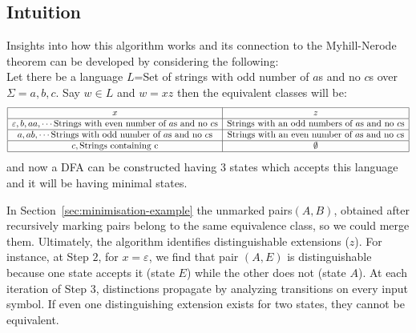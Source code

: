 \documentclass{article}
\begin{document}
\subsection{Intuition}
Insights into how this algorithm works and its connection to the Myhill-Nerode theorem can be developed by considering the following:\\
Let there be a language $L$=Set of strings with odd number of $a$s and no $c$s over $\Sigma={a,b,c}.$
Say $w\in L$ and $w=xz$ then the equivalent classes will be:
$$
\begin{array}{|c|c|}
\hline
x & z \\ \hline
\varepsilon, b, aa,\cdots \text{Strings with even number of $a$s and no $c$s} & \text{Strings with an odd numbers of $a$s and no $c$s} \\ \hline
a,ab,\cdots \text{Strings with odd number of $a$s and no $c$s} & \text{Strings with an even number of $a$s and no $c$s} \\ \hline
c,\text{Strings containing c} & \emptyset \\ \hline
\end{array}
$$
and now a DFA can be constructed having $3$ states which accepts this language and it will be having minimal states.

In Section~\ref{sec:minimisation-example} the unmarked pairs$(A,B)$, obtained after recursively marking pairs belong to the same equivalence class, so we could merge them.
Ultimately, the algorithm identifies distinguishable extensions ($z$). For instance, at Step $2$, for $x = \varepsilon$, we find that pair $(A,E)$ is distinguishable because one state accepts it (state $E$) while the other does not (state $A$). At each iteration of Step $3$, distinctions propagate by analyzing transitions on every input symbol. If even one distinguishing extension exists for two states, they cannot be equivalent.
\end{document}

